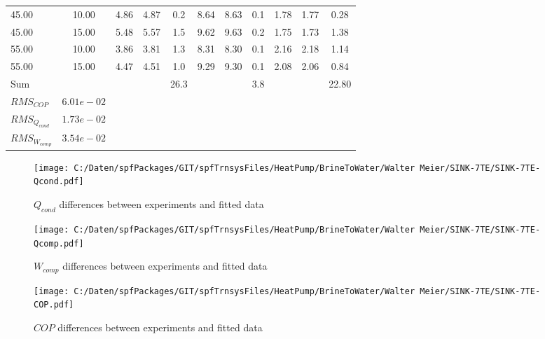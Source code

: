 \documentclass[english]{SPFShortReport}
\begin{document}
\begin{table}[!ht]
\begin{small}
\begin{center}
{\begin{tabular}{l | c c c c c c c c c c }
45.00  & 10.00 & 4.86 & 4.87 & 0.2 & 8.64 & 8.63 & 0.1 & 1.78 & 1.77 & 0.28\\ 
45.00  & 15.00 & 5.48 & 5.57 & 1.5 & 9.62 & 9.63 & 0.2 & 1.75 & 1.73 & 1.38\\ 
55.00  & 10.00 & 3.86 & 3.81 & 1.3 & 8.31 & 8.30 & 0.1 & 2.16 & 2.18 & 1.14\\ 
55.00  & 15.00 & 4.47 & 4.51 & 1.0 & 9.29 & 9.30 & 0.1 & 2.08 & 2.06 & 0.84\\ 
\hline 
 Sum &  & &  & 26.3 &  &  & 3.8 & &  & 22.80\\ 
\hline 
 $RMS_{COP}$ & $6.01e-02$ \\ 
 $RMS_{Q_{cond}}$ & $1.73e-02$ \\ 
 $RMS_{W_{comp}}$ & $3.54e-02$ \\ 
\hline
\hline
\end{tabular}
}
\label{ErrorsTable}
\end{center}
\end{small}
\end{table}
\begin{figure}[!ht]
\begin{center}
\texttt{[image: C:/Daten/spfPackages/GIT/spfTrnsysFiles/HeatPump/BrineToWater/Walter Meier/SINK-7TE/SINK-7TE-Qcond.pdf]}
\caption{$Q_{cond}$ differences between experiments and fitted data}
\label{QcongFig}
\end{center}
\end{figure}
\begin{figure}[!ht]
\begin{center}
\texttt{[image: C:/Daten/spfPackages/GIT/spfTrnsysFiles/HeatPump/BrineToWater/Walter Meier/SINK-7TE/SINK-7TE-Qcomp.pdf]}
\caption{$W_{comp}$ differences between experiments and fitted data}
\label{QcompFig}
\end{center}
\end{figure}
\begin{figure}[!ht]
\begin{center}
\texttt{[image: C:/Daten/spfPackages/GIT/spfTrnsysFiles/HeatPump/BrineToWater/Walter Meier/SINK-7TE/SINK-7TE-COP.pdf]}
\caption{$COP$ differences between experiments and fitted data}
\label{COPFig}
\end{center}
\end{figure}
\end{document}
